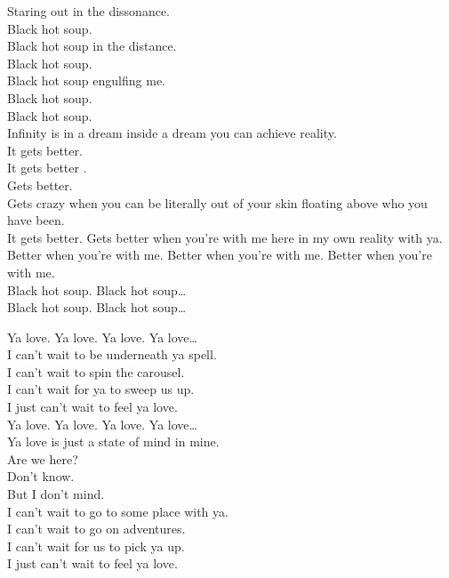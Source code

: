 Staring out in the dissonance. \\
Black hot soup. \\
Black hot soup in the distance. \\
Black hot soup. \\
Black hot soup engulfing me. \\
Black hot soup. \\

Black hot soup. \\

Infinity is in a dream inside a dream you can achieve reality. \\
It gets better. \\
It gets better .\\
Gets better. \\
Gets crazy when you can be literally out of your skin floating above who you have been. \\
It gets better. Gets better when you're with me here in my own reality with ya. \\
Better when you're with me. Better when you're with me. Better when you're with me. \\

Black hot soup. Black hot soup… \\
Black hot soup. Black hot soup… \\




Ya love. Ya love. Ya love. Ya love… \\

I can't wait to be underneath ya spell. \\
I can't wait to spin the carousel. \\
I can't wait for ya to sweep us up. \\
I just can't wait to feel ya love. \\

Ya love. Ya love. Ya love. Ya love… \\

Ya love is just a state of mind in mine. \\
Are we here? \\
Don't know. \\
But I don't mind. \\

I can't wait to go to some place with ya. \\
I can't wait to go on adventures. \\
I can't wait for us to pick ya up. \\
I just can't wait to feel ya love. \\

